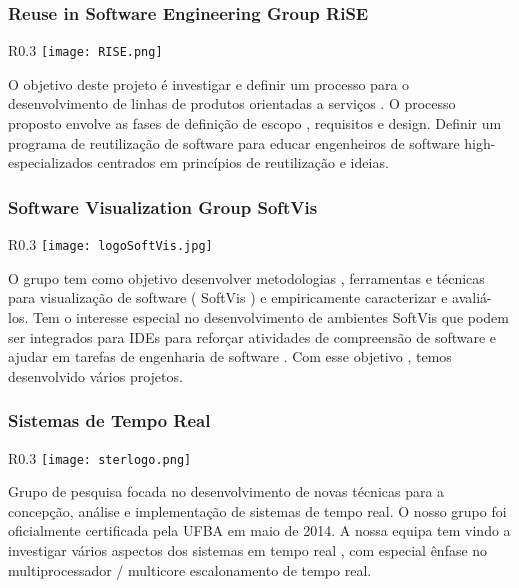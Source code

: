 \subsubsection{Reuse in Software Engineering Group RiSE}
\begin{wrapfigure}{R}{0.3\textwidth}
            \centering
            \texttt{[image: RISE.png]}
        \end{wrapfigure}
O objetivo deste projeto é investigar e definir um processo para o desenvolvimento de linhas de produtos orientadas a serviços . O processo proposto envolve as fases de definição de escopo , requisitos e design. Definir um programa de reutilização de software para educar engenheiros de software high- especializados centrados em princípios de reutilização e ideias.

\subsubsection{Software Visualization Group SoftVis}
\begin{wrapfigure}{R}{0.3\textwidth}
            \centering
            \texttt{[image: logoSoftVis.jpg]}
        \end{wrapfigure}
O grupo tem como objetivo desenvolver metodologias , ferramentas e técnicas para visualização de software ( SoftVis ) e empiricamente caracterizar e avaliá-los. Tem o interesse especial no desenvolvimento de ambientes SoftVis que podem ser integrados para IDEs para reforçar atividades de compreensão de software e ajudar em tarefas de engenharia de software . Com esse objetivo , temos desenvolvido vários projetos.

\subsubsection{Sistemas de Tempo Real}
\begin{wrapfigure}{R}{0.3\textwidth}
            \centering
            \texttt{[image: sterlogo.png]}
        \end{wrapfigure}
Grupo de pesquisa focada no desenvolvimento de novas técnicas para a concepção, análise e implementação de sistemas de tempo real. O nosso grupo foi oficialmente certificada pela UFBA em maio de 2014. A nossa equipa tem vindo a investigar vários aspectos dos sistemas em tempo real , com especial ênfase no multiprocessador / multicore escalonamento de tempo real.

